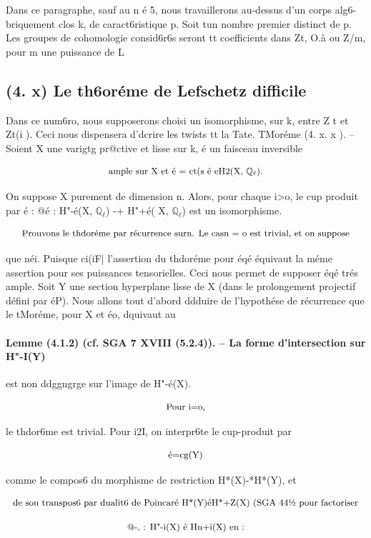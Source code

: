 \documentclass[11pt]{article}
\theoremstyle{remark}
\begin{document}
Dans ce paragraphe, sauf au n é 5, nous travaillerons au-dessus d'un corps alg6- briquement clos k, de caract6ristique p. Soit tun nombre premier distinct de p. Les groupes de cohomologie consid6r6s seront tt coefficients dans Zt, O.à ou Z/m, pour m une puissance de L

\subsection*{(4. x) Le th6oréme de Lefschetz difficile}

Dans ce num6ro, nous supposerons choisi un isomorphisme, sur k, entre Z t et Zt(i ). Ceci nous dispensera d'dcrire les twists tt la Tate. TMoréme (4. x. x ). -- Soient X une varigtg pr@ctive et lisse sur k, é un faisceau inversible

\[\text{\small ample sur X et é = ct(s é eH2(X, \(\mathbb{Q}_{\ell}\)).}\]

On suppose X purement de dimension n. Alors, pour chaque i>o, le cup produit par é : @é : H"-é(X, \(\mathbb{Q}_{\ell}\)) -+ H"+é( X, \(\mathbb{Q}_{\ell}\)) est un isomorphisme.

\[\text{\small Prouvons le thdoréme par récurrence surn. Le casn = o est trivial, et on suppose}\]

que néi. Puisque ci(iF| l'assertion du thdoréme pour éqé équivaut la méme assertion pour ses puissances tensorielles. Ceci nous permet de supposer éqé trés ample. Soit Y une section hyperplane lisse de X (dans le prolongement projectif défini par éP). Nous allons tout d'abord ddduire de l'hypothése de récurrence que le tMoréme, pour X et éo, dquivaut au

\paragraph{Lemme (4.1.2) (cf. SGA 7 XVIII (5.2.4)). -- La forme d'intersection sur H"-I(Y)}

est non ddggngrge sur l'image de H"-é(X).

\[\text{\small Pour i=o,}\]

le thdor6me est trivial. Pour i2I, on interpr6te le cup-produit par

\[\text{\small é=cg(Y)}\]

comme le compos6 du morphisme de restriction H*(X)-*H*(Y), et

\[\text{\small de son transpos6 par dualit6 de Poincaré H*(Y)éH*+Z(X) (SGA 44½ pour factoriser}\]

\[\text{\small @-, : H"-i(X) é Hn+i(X) en :}\]
\end{document}
